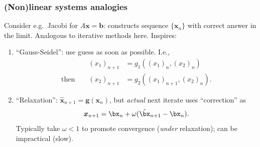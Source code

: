 \documentclass{beamer}
\newcommand{\bfm}[1]{{\boldsymbol{#1}}}
\begin{document}
\begin{frame}
  \frametitle{(Non)linear systems analogies}

  Consider e.g.\ Jacobi for $A \bfm{x} = \bfm{b}$: constructs sequence $\{ \bfm{x}_n\}$ with correct answer in the limit. Analogous to iterative methods here. \pause Inspires:
  \begin{enumerate}
  \item ``Gauss-Seidel'': use guess as soon as possible. I.e.,
    \begin{align*}
      &&(x_1)_{n+1} & = g_1\left((x_1)_n, (x_2)_n\right) \\
      \text{then }&& (x_2)_{n+1} &= g_2\left((x_1)_{n+1}, (x_2)_n\right).
    \end{align*}
  \item ``Relaxation'': $\hat{\bfm{x}}_{n+1} = \bfm{g}(\bfm{x}_n)$, but
    \emph{actual} next iterate uses  ``correction'' as
    \begin{equation*}
      \bfm{x}_{n+1} = \bx_n + \omega (\hat{\bx}_{n+1} - \bx_n).
    \end{equation*}
    Typically take $\omega < 1$ to promote convergence
    (\emph{under} relaxation); can be impractical (slow).
  \end{enumerate}



\end{frame}
\end{document}
